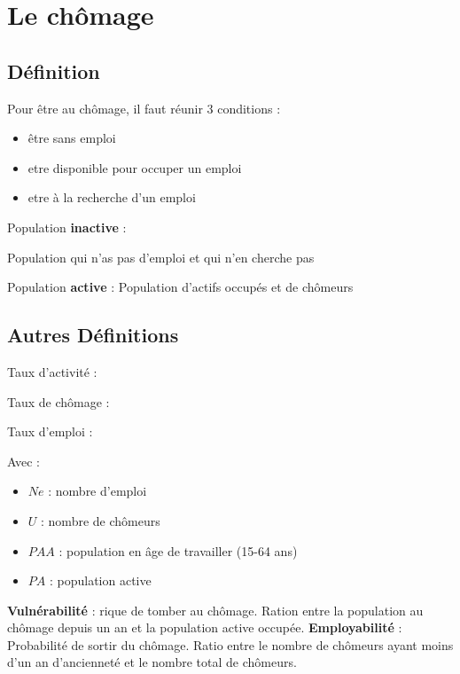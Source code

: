 \section{Le chômage}
\subsection{Définition}
Pour être au chômage, il faut réunir 3 conditions :
\begin{itemize}
    \item être sans emploi
    \item etre disponible pour occuper un emploi
    \item etre à la recherche d'un emploi
\end{itemize} 
Population \textbf{inactive} : \newline

Population qui n'as pas d'emploi et qui n'en cherche pas \newline

Population \textbf{active} : \newline
Population d'actifs occupés et de chômeurs
\newpage
\subsection{Autres Définitions}
Taux d'activité : 
\begin{center}
    \Large{}
\end{center}
Taux de chômage : 
\begin{center}
    \Large{}
\end{center}
Taux d'emploi : 
\begin{center}
    \Large{}
\end{center}
Avec : 
\begin{itemize}
    \item $Ne$ : nombre d'emploi
    \item $U$ : nombre de chômeurs
    \item $PAA$ : population en âge de travailler (15-64 ans)
    \item $PA$ : population active \newline
\end{itemize}
\textbf{Vulnérabilité} : rique de tomber au chômage. Ration entre la population au chômage depuis un an et la population active occupée.
\newline
\textbf{Employabilité} : Probabilité de sortir du chômage. Ratio entre le nombre de chômeurs ayant moins d'un an d'ancienneté et le nombre total de chômeurs.
\newpage
